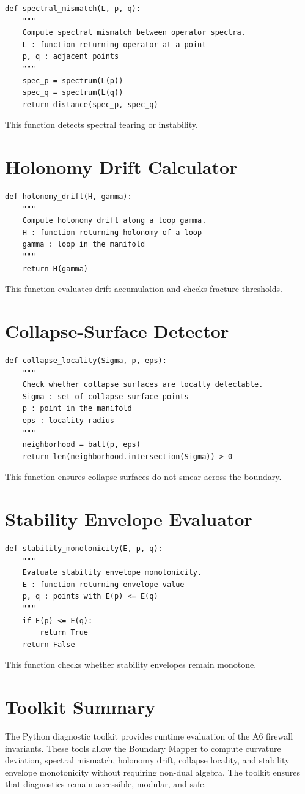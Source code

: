 \begin{verbatim}
def spectral_mismatch(L, p, q):
    """
    Compute spectral mismatch between operator spectra.
    L : function returning operator at a point
    p, q : adjacent points
    """
    spec_p = spectrum(L(p))
    spec_q = spectrum(L(q))
    return distance(spec_p, spec_q)
\end{verbatim}

This function detects spectral tearing or instability.

\section{Holonomy Drift Calculator}

\begin{verbatim}
def holonomy_drift(H, gamma):
    """
    Compute holonomy drift along a loop gamma.
    H : function returning holonomy of a loop
    gamma : loop in the manifold
    """
    return H(gamma)
\end{verbatim}

This function evaluates drift accumulation and checks fracture thresholds.

\section{Collapse-Surface Detector}

\begin{verbatim}
def collapse_locality(Sigma, p, eps):
    """
    Check whether collapse surfaces are locally detectable.
    Sigma : set of collapse-surface points
    p : point in the manifold
    eps : locality radius
    """
    neighborhood = ball(p, eps)
    return len(neighborhood.intersection(Sigma)) > 0
\end{verbatim}

This function ensures collapse surfaces do not smear across the boundary.

\section{Stability Envelope Evaluator}

\begin{verbatim}
def stability_monotonicity(E, p, q):
    """
    Evaluate stability envelope monotonicity.
    E : function returning envelope value
    p, q : points with E(p) <= E(q)
    """
    if E(p) <= E(q):
        return True
    return False
\end{verbatim}

This function checks whether stability envelopes remain monotone.

\section{Toolkit Summary}

The Python diagnostic toolkit provides runtime evaluation of the A6 firewall
invariants. These tools allow the Boundary Mapper to compute curvature
deviation, spectral mismatch, holonomy drift, collapse locality, and
stability envelope monotonicity without requiring non-dual algebra. The
toolkit ensures that diagnostics remain accessible, modular, and safe.
